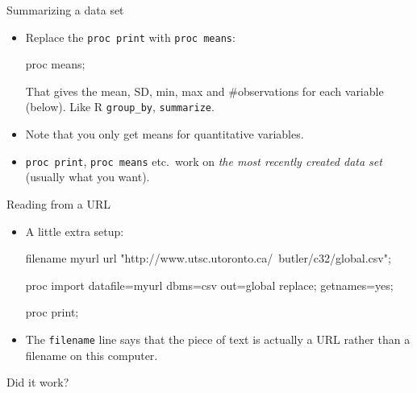\documentclass[unknownkeysallowed]{beamer}\usepackage[]{graphicx}\usepackage[]{color}
\begin{document}
\begin{frame}[fragile]{Summarizing a data set}
  
  \begin{itemize}
  \item Replace the \texttt{proc print} with \texttt{proc means}:
    
    \begin{Sascode}[store=rb]
proc means;      
    \end{Sascode}
    
    That gives the mean, SD, min, max and \#observations for each
    variable (below). Like R \texttt{group\_by}, \texttt{summarize}.
    
    \item Note that you only get means for quantitative variables.
    \item \texttt{proc print}, \texttt{proc means} etc.\ work on
      \emph{the most recently created data set} (usually what you
      want). 
    


  \end{itemize}
  
\end{frame}

\begin{frame}[fragile]{Reading from a URL}
  
  \begin{itemize}
  \item A little extra setup:
    
    \begin{small}
    \begin{Sascode}[store=ua]
filename myurl url 
  "http://www.utsc.utoronto.ca/~butler/c32/global.csv";

proc import 
  datafile=myurl 
  dbms=csv
  out=global
  replace;
  getnames=yes;
  
proc print;
    \end{Sascode}
      
    \end{small}
    
    
  \item The \texttt{filename} line says that the piece of text is
    actually a URL rather than a filename on this computer.
  \end{itemize}
  
\end{frame}

\begin{frame}[fragile]{Did it work?}
  
  
\end{frame}
\end{document}
